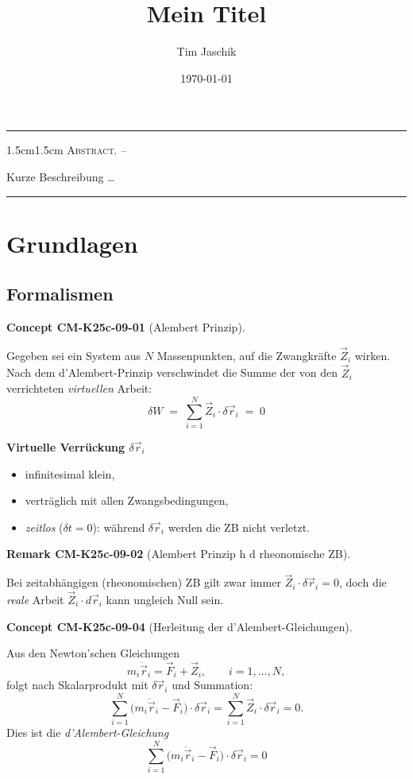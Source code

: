 \documentclass[10pt, letterpaper]{article}
\title{Mein Titel}
\author{Tim Jaschik}
\date{\today}
\renewenvironment{abstract}
  {
    \begin{adjustwidth}{1.5cm}{1.5cm}
    \small
    \textsc{Abstract. –}%
  }
  {
    \end{adjustwidth}
  }
\newcommand{\CustomHeading}[3]{%
  \par\medskip\noindent%
  \textbf{#1 #2} \textnormal{(#3)}.\enskip%
}
\newenvironment{REM}[2]{\CustomHeading{Remark}{#1}{#2}}{}
\newenvironment{CONC}[2]{\CustomHeading{Concept}{#1}{#2}}{}
\begin{document}
\maketitle
\rule{\textwidth}{0.5pt}
\begin{abstract}
Kurze Beschreibung …
\end{abstract}
\rule{\textwidth}{0.5pt}
\vspace{0.5cm}

\tableofcontents

\pagebreak

\section{Grundlagen}

\subsection{Formalismen}

\begin{CONC}{CM-K25c-09-01}{Alembert Prinzip}
Gegeben sei ein System aus $N$ Massenpunkten, auf die Zwangkräfte 
$\vec Z_i$ wirken.  
Nach dem d’Alembert-Prinzip verschwindet die Summe der von den 
$\vec Z_i$ verrichteten \emph{virtuellen} Arbeit:
\[
  \boxed{\;
    \delta W \;=\;\sum_{i=1}^{N}\vec Z_i\!\cdot\!\delta\vec r_i \;=\;0
  \;}
\]

\textbf{Virtuelle Verrückung $\delta\vec r_i$}
\begin{itemize}
  \item infinitesimal klein,
  \item verträglich mit allen Zwangsbedingungen,
  \item \emph{zeitlos} ($\delta t=0$): während $\delta\vec r_i$ werden 
        die ZB nicht verletzt.
\end{itemize}
\end{CONC}

\begin{REM}{CM-K25c-09-02}{Alembert Prinzip h d rheonomische ZB}
Bei zeitabhängigen (rheonomischen) ZB gilt zwar immer 
$\vec Z_i\!\cdot\!\delta\vec r_i=0$,  
doch die \emph{reale} Arbeit $\vec Z_i\!\cdot\!d\vec r_i$ kann ungleich 
Null sein.
\end{REM}

\begin{CONC}{CM-K25c-09-04}{Herleitung der d’Alembert-Gleichungen}
Aus den Newton’schen Gleichungen
\[
  m_i\ddot{\vec r}_i = \vec F_i + \vec Z_i,
  \qquad i=1,\dots,N,
\]
folgt nach Skalar­produkt mit $\delta\vec r_i$ und Summation:
\[
  \sum_{i=1}^{N}\bigl(m_i\ddot{\vec r}_i - \vec F_i\bigr)\!\cdot\!\delta\vec r_i
  = \sum_{i=1}^{N}\vec Z_i\!\cdot\!\delta\vec r_i = 0.
\]
Dies ist die \emph{d’Alembert-Gleichung}
\[
  \boxed{\;
    \sum_{i=1}^{N}\bigl(m_i\ddot{\vec r}_i - \vec F_i\bigr)
    \!\cdot\!\delta\vec r_i = 0
  \;}
\]
\end{CONC}
\end{document}
